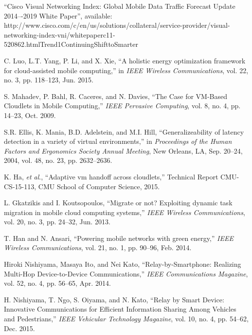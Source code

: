 \documentclass[journal,12pt,draftclsnofoot,onecolumn]{IEEEtran}
\begin{document}
\ifCLASSOPTIONcaptionsoff
  \newpage
\fi




\begin{thebibliography}{1}

``Cisco Visual Networking Index: Global Mobile Data Traffic Forecast Update 2014–-2019 White Paper'', available: http://www.cisco.com/c/en/us/solutions/collateral/service-provider/visual-networking-index-vni/whitepaperc11-520862.htmlTrend1ContinuingShifttoSmarter

C. Luo, L.T. Yang, P. Li, and X. Xie, ``A holistic energy optimization framework for cloud-assisted mobile computing,'' in \emph{IEEE Wireless Communications}, vol. 22, no. 3, pp. 118--123, Jun. 2015.

S. Mahadev, P. Bahl, R. Caceres, and N. Davies, ``The Case for VM-Based Cloudlets in Mobile Computing,'' \emph{IEEE Pervasive Computing}, vol. 8, no. 4, pp. 14--23, Oct. 2009.

S.R. Ellis, K. Mania, B.D. Adelstein, and M.I. Hill, ``Generalizeability of latency detection in a variety of virtual environments,'' in \emph{Proceedings of the Human Factors and Ergonomics Society Annual Meeting}, New Orleans, LA, Sep. 20--24, 2004, vol. 48, no. 23, pp. 2632--2636.

K. Ha, \emph{et al}., ``Adaptive vm handoff across cloudlets,'' Technical Report CMU-CS-15-113, CMU School of Computer Science, 2015.

L. Gkatzikis and I. Koutsopoulos, ``Migrate or not? Exploiting dynamic task migration in mobile cloud computing systems,'' \emph{IEEE Wireless Communications}, vol. 20, no. 3, pp. 24--32, Jun. 2013.

T. Han and N. Ansari, ``Powering mobile networks with green energy,'' \emph{IEEE Wireless Communications}, vol. 21, no. 1, pp. 90--96, Feb. 2014.

Hiroki Nishiyama, Masaya Ito, and Nei Kato, ``Relay-by-Smartphone: Realizing Multi-Hop Device-to-Device Communications,'' \emph{IEEE Communications Magazine}, vol. 52, no. 4, pp. 56--65, Apr. 2014.

H. Nishiyama, T. Ngo, S. Oiyama, and N. Kato, ``Relay by Smart Device: Innovative Communications for Efficient Information Sharing Among Vehicles and Pedestrians,'' \emph{IEEE Vehicular Technology Magazine}, vol. 10, no. 4, pp. 54--62, Dec. 2015.




\end{thebibliography}
\end{document}

